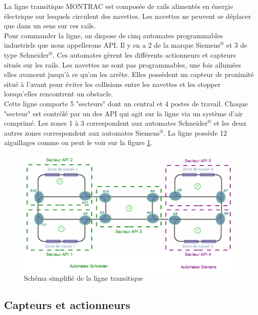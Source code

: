 \documentclass[a4paper,french, titlepage]{book}
\begin{document}
La ligne transitique MONTRAC est composée de rails alimentés en énergie électrique sur lesquels circulent des navettes. Les navettes ne peuvent se déplacer que dans un sens sur ces rails.\\
     
Pour commander la ligne, on dispose de cinq automates programmables industriels que nous appellerons API. Il y en a 2 de la marque Siemens$^{\circledR}$ et 3 de type Schneider$^{\circledR}$. Ces automates gèrent les différents actionneurs et capteurs situés sur les rails. Les navettes ne sont pas programmables, une fois allumées elles avancent jusqu'à ce qu'on les arrête. Elles possèdent un capteur de proximité situé à l'avant pour éviter les collisions entre les navettes et les stopper lorsqu'elles rencontrent un obstacle.\\       

Cette ligne comporte 5 "secteurs" dont un central et 4 postes de travail. Chaque "secteur" est contrôlé par un des API qui agit sur la ligne via un système d'air comprimé. Les zones 1 à 3 correspondent aux automates Schneider$^{\circledR}$ et les deux autres zones correspondent aux automates Siemens$^{\circledR}$. La ligne possède 12 aiguillages comme on peut le voir sur la figure \ref{Les zones de travail}.

\begin{figure}[H] 
\begin{center}
\includegraphics[scale=0.65]{Images/zone_travail.png} 
\end{center}
\caption{Schéma simplifié de la ligne transitique}
\label{Les zones de travail}
\end{figure} 


\newpage
\subsection{Capteurs et actionneurs}
\end{document}
